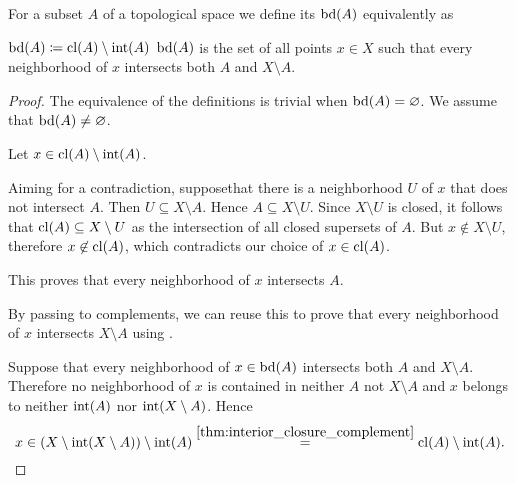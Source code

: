 \begin{definition}\label{def:topological_boundary}
  For a subset \( A \) of a topological space we define its  \( \operatorname{bd}(A) \) equivalently as
  \begin{DefEnum}
     \( \operatorname{bd}(A) \coloneqq \operatorname{cl}(A) \setminus \operatorname{int}(A) \)
     \( \operatorname{bd}(A) \) is the set of all points \( x \in X \) such that every neighborhood of \( x \) intersects both \( A \) and \( X \setminus A \).
  \end{DefEnum}
\end{definition}
\begin{proof}
  The equivalence of the definitions is trivial when \( \operatorname{bd}(A) = \varnothing \). We assume that \( \operatorname{bd}(A) \neq \varnothing \).

   Let \( x \in \operatorname{cl}(A) \setminus \operatorname{int}(A) \).

  Aiming for a contradiction, suppose\LEM that there is a neighborhood \( U \) of \( x \) that does not intersect \( A \). Then \( U \subseteq X \setminus A \). Hence \( A \subseteq X \setminus U \). Since \( X \setminus U \) is closed, it follows that \( \operatorname{cl}(A) \subseteq X \setminus U \) as the intersection of all closed supersets of \( A \). But \( x \not\in X \setminus U \), therefore \( x \not\in \operatorname{cl}(A) \), which contradicts our choice of \( x \in \operatorname{cl}(A) \).

  This proves that every neighborhood of \( x \) intersects \( A \).

  By passing to complements, we can reuse this to prove that every neighborhood of \( x \) intersects \( X \setminus A \) using .

   Suppose that every neighborhood of \( x \in \operatorname{bd}(A) \) intersects both \( A \) and \( X \setminus A \). Therefore no neighborhood of \( x \) is contained in neither \( A \) not \( X \setminus A \) and \( x \) belongs to neither \( \operatorname{int}(A) \) nor \( \operatorname{int}(X \setminus A) \). Hence
  \begin{equation*}
    x \in (X \setminus \operatorname{int}(X \setminus A)) \setminus \operatorname{int}(A) \overset {\ref{thm:interior_closure_complement}} = \operatorname{cl}(A) \setminus \operatorname{int}(A).
  \end{equation*}
\end{proof}

